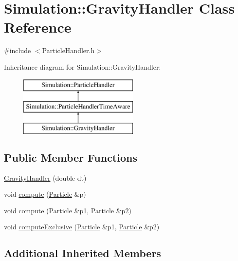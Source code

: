 \hypertarget{classSimulation_1_1GravityHandler}{\section{Simulation\-:\-:Gravity\-Handler Class Reference}
\label{classSimulation_1_1GravityHandler}
}


{\ttfamily \#include $<$Particle\-Handler.\-h$>$}

Inheritance diagram for Simulation\-:\-:Gravity\-Handler\-:\begin{figure}[H]
\begin{center}
\leavevmode
\includegraphics[height=3.000000cm]{classSimulation_1_1GravityHandler}
\end{center}
\end{figure}
\subsection*{Public Member Functions}
\begin{DoxyCompactItemize}
\item 
\hyperlink{classSimulation_1_1GravityHandler_abe61e3434323c7b7aaf52f00ac613bc9}{Gravity\-Handler} (double dt)
\item 
void \hyperlink{classSimulation_1_1GravityHandler_a7f5b0d36e4e8e3dd6eb54d364add0287}{compute} (\hyperlink{classSimulation_1_1Particle}{Particle} \&p)
\item 
void \hyperlink{classSimulation_1_1GravityHandler_a7805aa1b40a206d9fe3362a321d933ed}{compute} (\hyperlink{classSimulation_1_1Particle}{Particle} \&p1, \hyperlink{classSimulation_1_1Particle}{Particle} \&p2)
\item 
void \hyperlink{classSimulation_1_1GravityHandler_a4abb48d878ea825e6582ba0bf9ae5c0d}{compute\-Exclusive} (\hyperlink{classSimulation_1_1Particle}{Particle} \&p1, \hyperlink{classSimulation_1_1Particle}{Particle} \&p2)
\end{DoxyCompactItemize}
\subsection*{Additional Inherited Members}


